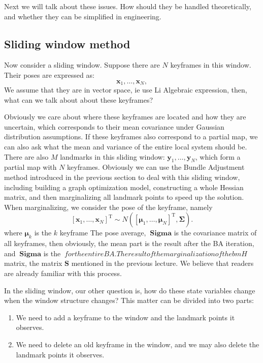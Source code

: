 Next we will talk about these issues. How should they be handled theoretically, and whether they can be simplified in engineering.

\subsection{Sliding window method}
Now consider a sliding window. Suppose there are $N$ keyframes in this window. Their poses are expressed as: $$\bm{x}_1, \ldots, \bm{x}_N,$$ We assume that they are in vector space, ie use Li Algebraic expression, then, what can we talk about about these keyframes?

Obviously we care about where these keyframes are located and how they are uncertain, which corresponds to their mean covariance under Gaussian distribution assumptions. If these keyframes also correspond to a partial map, we can also ask what the mean and variance of the entire local system should be. There are also $M$ landmarks in this sliding window: $\bm{y}_1, \ldots, \bm{y}_N$, which form a partial map with $N$ keyframes. Obviously we can use the Bundle Adjustment method introduced in the previous section to deal with this sliding window, including building a graph optimization model, constructing a whole Hessian matrix, and then marginalizing all landmark points to speed up the solution. When marginalizing, we consider the pose of the keyframe, namely $$[\bm{x}_1, \ldots, \bm{x}_N]^\mathrm{T} \sim N([\boldsymbol{\mu }_1, \ldots, \boldsymbol{\mu}_N]^\mathrm{T}, \boldsymbol{\Sigma}).$$ where $\boldsymbol{\mu}_k$ is the $k$ keyframe The pose average, $\boldsymbol{\ Sigma}$ is the covariance matrix of all keyframes, then obviously, the mean part is the result after the BA iteration, and $\boldsymbol{\ Sigma}$ is the $\ for the entire BA. The result of the marginalization of the bm{H}$ matrix, the matrix $\bm{S}$ mentioned in the previous lecture. We believe that readers are already familiar with this process.

In the sliding window, our other question is, how do these state variables change when the window structure changes? This matter can be divided into two parts:
\begin{enumerate}
\item We need to add a keyframe to the window and the landmark points it observes.
\item We need to delete an old keyframe in the window, and we may also delete the landmark points it observes.
\end{enumerate}

